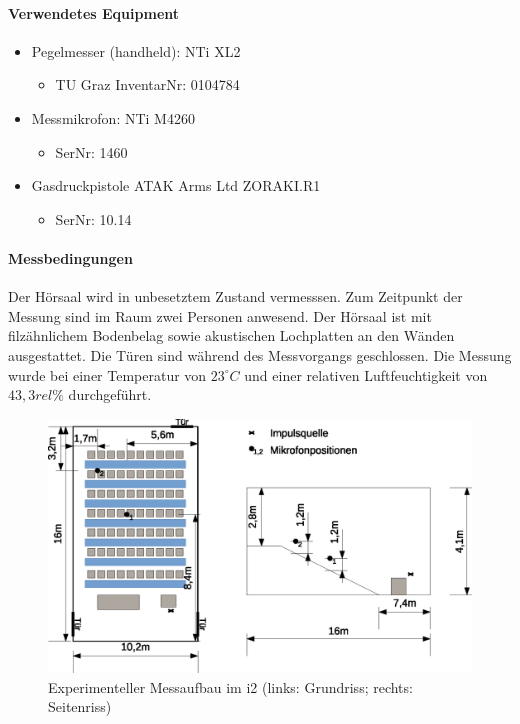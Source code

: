 \documentclass[11pt]{report}
\begin{document}
\paragraph{Verwendetes Equipment}
\begin{itemize}
\item Pegelmesser (handheld): NTi XL2
\begin{itemize}
\item TU Graz InventarNr: 0104784
\end{itemize}
\item Messmikrofon: NTi M4260
\begin{itemize}
\item SerNr: 1460
\end{itemize}
\item Gasdruckpistole ATAK Arms Ltd ZORAKI.R1
\begin{itemize}
\item SerNr: 10.14
\end{itemize}
\end{itemize}
\paragraph{Messbedingungen}
Der H\"orsaal wird in unbesetztem Zustand vermesssen. Zum Zeitpunkt der Messung sind im Raum zwei Personen anwesend. Der H\"orsaal ist mit filz\"ahnlichem Bodenbelag sowie akustischen Lochplatten an den W\"anden ausgestattet. Die T\"uren sind w\"ahrend des Messvorgangs geschlossen. Die Messung wurde bei einer Temperatur von $23^\circ C$ und einer relativen Luftfeuchtigkeit von $43,3rel\%$ durchgef\"uhrt. 
\begin{figure}[htbp]
\begin{center}
\includegraphics[width=14cm,keepaspectratio=true]{i2}
\caption{Experimenteller Messaufbau im i2 (links: Grundriss; rechts: Seitenriss)}
\label{fig:i2geometrics}
\end{center}
\end{figure}
\end{document}
